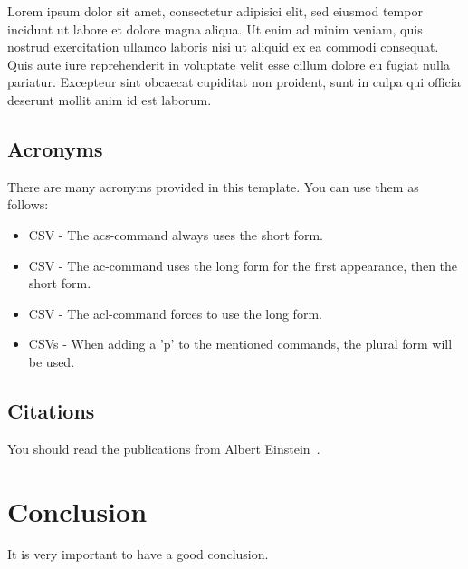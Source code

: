 Lorem ipsum dolor sit amet, consectetur adipisici elit, sed eiusmod tempor incidunt ut labore et dolore magna aliqua. Ut enim ad minim veniam, quis nostrud exercitation ullamco laboris nisi ut aliquid ex ea commodi consequat. Quis aute iure reprehenderit in voluptate velit esse cillum dolore eu fugiat nulla pariatur. Excepteur sint obcaecat cupiditat non proident, sunt in culpa qui officia deserunt mollit anim id est laborum.


\subsection{Acronyms}
\label{sec:Acronyms}

There are many acronyms provided in this template. You can use them as follows:
\begin{itemize}
	\item \acs{CSV} - The acs-command always uses the short form.
	\item \ac{CSV} - The ac-command uses the long form for the first appearance, then the short form.
	\item \acl{CSV} - The acl-command forces to use the long form.
	\item \acp{CSV} - When adding a 'p' to the mentioned commands, the plural form will be used.
\end{itemize}

\subsection{Citations}
You should read the publications from Albert Einstein~\cite{einstein1920relativity}.

\section{Conclusion}
\label{sec:Conclusion}

It is very important to have a good conclusion.